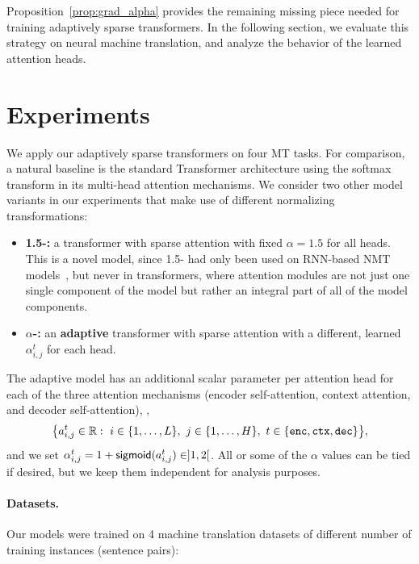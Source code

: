 Proposition~\ref{prop:grad_alpha} provides the remaining missing
piece needed for training adaptively sparse transformers. In the
following section, we evaluate this strategy on neural machine
translation, and analyze the behavior of the learned attention heads.

\section{Experiments}
We apply our adaptively sparse transformers on four MT tasks.
For comparison, a natural baseline is the standard Transformer
architecture using the softmax transform in its multi-head attention mechanisms.
We consider two other model variants in our experiments that make use of different
normalizing transformations:

\begin{itemize}
    \item \textbf{1.5-\entmaxtext:} a transformer with sparse \entmaxtext
          attention with fixed $\alpha=1.5$ for all heads. This is a novel model,
          since 1.5-\entmaxtext{} had only been used on
          RNN-based NMT models~\citep{entmax}, but never
          in transformers, where attention modules are not just one single
          component of the model but rather an integral part of all of
          the model components.%
    \item \textbf{\boldmath $\alpha$-\entmaxtext:} an \textbf{adaptive}
          transformer with sparse \entmaxtext attention with a different,
          learned $\alpha_{i,j}^t$ for each head.
\end{itemize}

The adaptive model has an additional scalar parameter per attention
head for each of the three attention mechanisms (encoder
self-attention, context attention, and decoder self-attention), \ie,
\begin{equation}
    \big \{ a_{i,j}^{t} \in \mathbb{R}:~
    i \in \{1, \dots, L\},~
    j \in \{1, \dots, H\},~
    t \in \{\texttt{enc}, \texttt{ctx}, \texttt{dec}\} \big\},
\end{equation}
and we set $\alpha_{i,j}^t = 1 + \operatorname*{\mathsf{sigmoid}}(a_{i,j}^t) \in ]1, 2[$.
All or some of the $\alpha$ values can be tied if desired, but we
keep them independent for analysis purposes.

\paragraph*{Datasets.} Our models were trained on 4 machine
translation datasets of different number of training instances
(sentence pairs):


